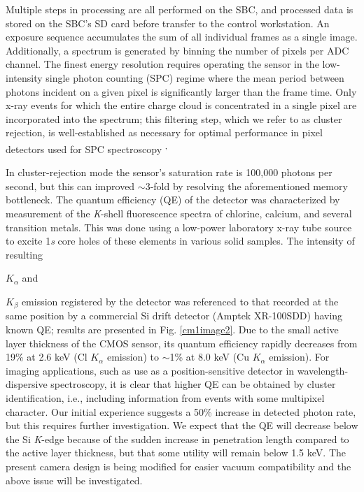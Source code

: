 \FloatBarrier

Multiple steps in processing are all performed on the SBC, and processed
data is stored on the SBC's SD card before transfer to the control
workstation. An exposure sequence accumulates the sum of all individual
frames as a single image. Additionally, a spectrum is generated by
binning the number of pixels per ADC channel. The finest energy
resolution requires operating the sensor in the low-intensity single
photon counting (SPC) regime where the mean period between photons
incident on a given pixel is significantly larger than the frame time.
Only x-ray events for which the entire charge cloud is concentrated in a
single pixel are incorporated into the spectrum; this filtering step,
which we refer to as cluster rejection, is well-established as necessary
for optimal performance in pixel detectors used for SPC
spectroscopy \cite{SERVOLI2010CHARACTERIZATION}\textsuperscript{,}

In cluster-rejection mode the sensor's saturation rate is 100,000
photons per second, but this can improved $\sim$3-fold by
resolving the aforementioned memory bottleneck. The quantum efficiency
(QE) of the detector was characterized by measurement of the
\emph{K}-shell fluorescence spectra of chlorine, calcium, and several
transition metals. This was done using a low-power laboratory x-ray tube
source to excite 1\emph{s} core holes of these elements in various solid
samples. The intensity of resulting
\(K_{\alpha}\)
and
\(K_{\beta}\)
emission registered by the detector was referenced to that recorded at
the same position by a commercial Si drift detector (Amptek XR-100SDD)
having known QE; results are presented in Fig. \ref{cm1image2}. Due to the small
active layer thickness of the CMOS sensor, its quantum efficiency
rapidly decreases from 19\% at 2.6 keV (Cl \(K_{\alpha}\) emission) to
$\sim$1\% at 8.0 keV (Cu \(K_{\alpha}\) emission). For
imaging applications, such as use as a position-sensitive detector in
wavelength-dispersive spectroscopy, it is clear that higher QE can be
obtained by cluster identification, i.e., including information from
events with some multipixel character. Our initial experience suggests a
50\% increase in detected photon rate, but this requires further
investigation. We expect that the QE will decrease below the Si
\emph{K}-edge because of the sudden increase in penetration length
compared to the active layer thickness, but that some utility will
remain below 1.5 keV. The present camera design is being modified for
easier vacuum compatibility and the above issue will be investigated.

